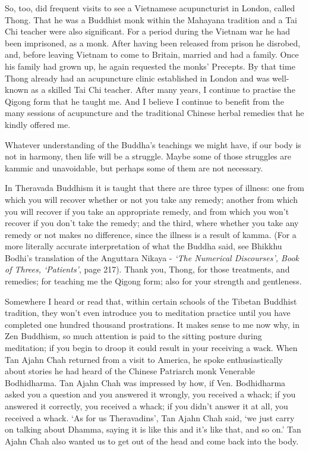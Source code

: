 So, too, did frequent visits to see a Vietnamese acupuncturist in
London, called Thong. That he was a Buddhist monk within the Mahayana
tradition and a Tai Chi teacher were also significant. For a period
during the Vietnam war he had been imprisoned, as a monk. After having
been released from prison he disrobed, and, before leaving Vietnam to
come to Britain, married and had a family. Once his family had grown up,
he again requested the monks' Precepts. By that time Thong already had
an acupuncture clinic established in London and was well-known as a
skilled Tai Chi teacher. After many years, I continue to practise the
Qigong form that he taught me. And I believe I continue to benefit from
the many sessions of acupuncture and the traditional Chinese herbal
remedies that he kindly offered me.

Whatever understanding of the Buddha's teachings we might have, if our
body is not in harmony, then life will be a struggle. Maybe some of
those struggles are kammic and unavoidable, but perhaps some of them are
not necessary.

In Theravada Buddhism it is taught that there are three types of
illness: one from which you will recover whether or not you take any
remedy; another from which you will recover if you take an appropriate
remedy, and from which you won't recover if you don't take the remedy;
and the third, where whether you take any remedy or not makes no
difference, since the illness is a result of kamma. (For a more
literally accurate interpretation of what the Buddha said, see Bhikkhu
Bodhi's translation of the Anguttara Nikaya - \emph{`The Numerical
Discourses', Book of Threes, `Patients'}, page 217). Thank you, Thong,
for those treatments, and remedies; for teaching me the Qigong form;
also for your strength and gentleness.

Somewhere I heard or read that, within certain schools of the Tibetan
Buddhist tradition, they won't even introduce you to meditation practice
until you have completed one hundred thousand prostrations. It makes
sense to me now why, in Zen Buddhism, so much attention is paid to the
sitting posture during meditation; if you begin to droop it could result
in your receiving a wack. When Tan Ajahn Chah returned from a visit to
America, he spoke enthusiastically about stories he had heard of the
Chinese Patriarch monk Venerable Bodhidharma. Tan Ajahn Chah was
impressed by how, if Ven. Bodhidharma asked you a question and you
answered it wrongly, you received a whack; if you answered it correctly,
you received a whack; if you didn't answer it at all, you received a
whack. `As for us Theravadins', Tan Ajahn Chah said, `we just carry on
talking about Dhamma, saying it is like this and it's like that, and so
on.' Tan Ajahn Chah also wanted us to get out of the head and come back
into the body.

